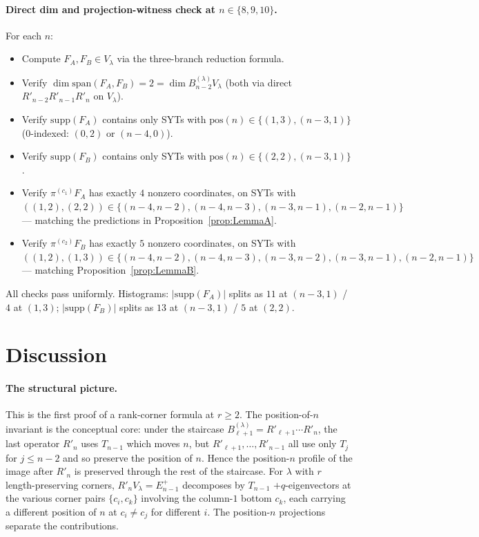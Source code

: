 \documentclass[11pt]{article}
\theoremstyle{definition}
\begin{document}
\paragraph{Direct dim and projection-witness check at $n \in \{8, 9, 10\}$.}
For each $n$:
\begin{itemize}[leftmargin=2em,topsep=0.3em,itemsep=0.2em]
\item Compute $F_A, F_B \in V_\lambda$ via the three-branch
reduction formula.
\item Verify $\dim \mathrm{span}(F_A, F_B) = 2 = \dim B_{n-2}^{(\lambda)} V_\lambda$
(both via direct $R'_{n-2} R'_{n-1} R'_n$ on $V_\lambda$).
\item Verify $\mathrm{supp}(F_A)$ contains only SYTs with
$\mathrm{pos}(n) \in \{(1, 3), (n-3, 1)\}$
(0-indexed: $(0, 2)$ or $(n-4, 0)$).
\item Verify $\mathrm{supp}(F_B)$ contains only SYTs with
$\mathrm{pos}(n) \in \{(2, 2), (n-3, 1)\}$.
\item Verify $\pi^{(c_1)} F_A$ has exactly $4$ nonzero coordinates,
on SYTs with $((1,2), (2,2)) \in \{(n{-}4, n{-}2), (n{-}4, n{-}3),
(n{-}3, n{-}1), (n{-}2, n{-}1)\}$ --- matching the predictions in
Proposition~\ref{prop:LemmaA}.
\item Verify $\pi^{(c_2)} F_B$ has exactly $5$ nonzero coordinates,
on SYTs with $((1,2), (1,3)) \in \{(n{-}4, n{-}2), (n{-}4, n{-}3),
(n{-}3, n{-}2), (n{-}3, n{-}1), (n{-}2, n{-}1)\}$ --- matching
Proposition~\ref{prop:LemmaB}.
\end{itemize}
All checks pass uniformly. Histograms: $|\mathrm{supp}(F_A)|$
splits as $11$ at $(n-3, 1)$ / $4$ at $(1, 3)$;
$|\mathrm{supp}(F_B)|$ splits as $13$ at $(n-3, 1)$ / $5$ at $(2, 2)$.

\section{Discussion}\label{sec:discussion}

\paragraph{The structural picture.}
This is the first proof of a rank-corner formula at $r \ge 2$. The
position-of-$n$ invariant is the conceptual core: under the
staircase $B_{\ell+1}^{(\lambda)} = R'_{\ell+1}\cdots R'_n$, the
last operator $R'_n$ uses $T_{n-1}$ which moves $n$, but
$R'_{\ell+1}, \ldots, R'_{n-1}$ all use only $T_j$ for
$j \le n-2$ and so preserve the position of $n$. Hence the
position-$n$ profile of the image after $R'_n$ is preserved through
the rest of the staircase. For $\lambda$ with $r$ length-preserving
corners, $R'_n V_\lambda = E_{n-1}^+$ decomposes by $T_{n-1}$
$+q$-eigenvectors at the various corner pairs $\{c_i, c_k\}$
involving the column-$1$ bottom $c_k$, each carrying a different
position of $n$ at $c_i \ne c_j$ for different $i$. The
position-$n$ projections separate the contributions.
\end{document}
